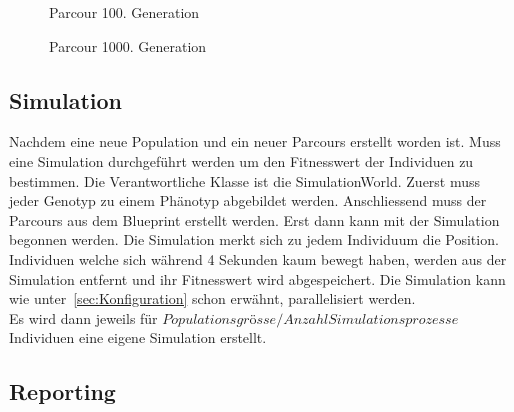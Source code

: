       \begin{figure}[H]
        \centering
        
        \caption{Parcour 100. Generation\label{fig:parcours2}}
      \end{figure}

      \begin{figure}[H]
        \centering
        
        \caption{Parcour 1000. Generation\label{fig:parcours3}}
      \end{figure}

      \subsection{Simulation\label{sec:simulation}}

      Nachdem eine neue Population und ein neuer Parcours erstellt worden ist.
      Muss eine Simulation durchgeführt werden um den Fitnesswert der Individuen zu bestimmen.
      Die Verantwortliche Klasse ist die SimulationWorld.
      Zuerst muss jeder Genotyp zu einem Phänotyp abgebildet werden.
      Anschliessend muss der Parcours aus dem Blueprint erstellt werden.
      Erst dann kann mit der Simulation begonnen werden.
      Die Simulation merkt sich zu jedem Individuum die Position.
      Individuen welche sich während 4 Sekunden kaum bewegt haben,
      werden aus der Simulation entfernt und ihr Fitnesswert wird abgespeichert.
      Die Simulation kann wie unter~\ref{sec:Konfiguration} schon erwähnt, parallelisiert werden. \\
      Es wird dann jeweils für \( Populationsgrösse / Anzahl Simulationsprozesse \) Individuen eine eigene Simulation erstellt.


    \subsection{Reporting\label{subsec:Reporting}}

